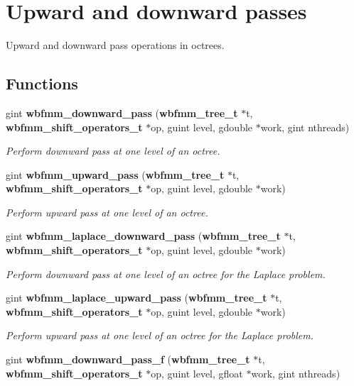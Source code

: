 \section{Upward and downward passes}
\label{group__pass}


Upward and downward pass operations in octrees.  


\subsection*{Functions}
\begin{DoxyCompactItemize}
\item 
gint {\bf wbfmm\+\_\+downward\+\_\+pass} ({\bf wbfmm\+\_\+tree\+\_\+t} $\ast$t, {\bf wbfmm\+\_\+shift\+\_\+operators\+\_\+t} $\ast$op, guint level, gdouble $\ast$work, gint nthreads)
\begin{DoxyCompactList}\small\item\em Perform downward pass at one level of an octree. \end{DoxyCompactList}\item 
gint {\bf wbfmm\+\_\+upward\+\_\+pass} ({\bf wbfmm\+\_\+tree\+\_\+t} $\ast$t, {\bf wbfmm\+\_\+shift\+\_\+operators\+\_\+t} $\ast$op, guint level, gdouble $\ast$work)
\begin{DoxyCompactList}\small\item\em Perform upward pass at one level of an octree. \end{DoxyCompactList}\item 
gint {\bf wbfmm\+\_\+laplace\+\_\+downward\+\_\+pass} ({\bf wbfmm\+\_\+tree\+\_\+t} $\ast$t, {\bf wbfmm\+\_\+shift\+\_\+operators\+\_\+t} $\ast$op, guint level, gdouble $\ast$work)
\begin{DoxyCompactList}\small\item\em Perform downward pass at one level of an octree for the Laplace problem. \end{DoxyCompactList}\item 
gint {\bf wbfmm\+\_\+laplace\+\_\+upward\+\_\+pass} ({\bf wbfmm\+\_\+tree\+\_\+t} $\ast$t, {\bf wbfmm\+\_\+shift\+\_\+operators\+\_\+t} $\ast$op, guint level, gdouble $\ast$work)
\begin{DoxyCompactList}\small\item\em Perform upward pass at one level of an octree for the Laplace problem. \end{DoxyCompactList}\item 
gint {\bf wbfmm\+\_\+downward\+\_\+pass\+\_\+f} ({\bf wbfmm\+\_\+tree\+\_\+t} $\ast$t, {\bf wbfmm\+\_\+shift\+\_\+operators\+\_\+t} $\ast$op, guint level, gfloat $\ast$work, gint nthreads)

\end{DoxyCompactItemize}
